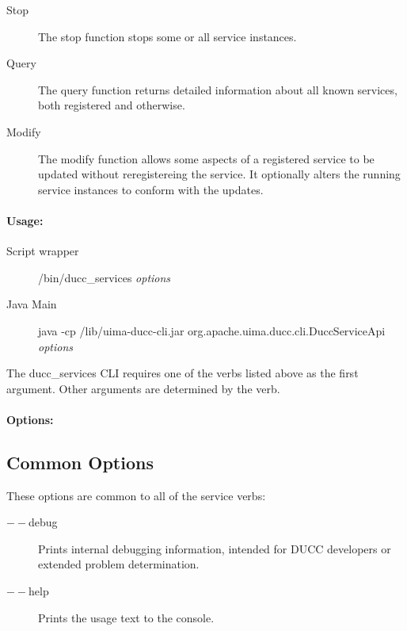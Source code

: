 \begin{description}
            \item[Stop] The stop function stops some or all service instances.
              
            \item[Query] The query function returns detailed information about all known services, both
              registered and otherwise.
              
            \item[Modify] The modify function allows some aspects of a registered service to be updated
              without reregistereing the service. It optionally alters the running service instances to
              conform with the updates.    
        \end{description}
            

    \paragraph{Usage:}
       \begin{description}
          \item[Script wrapper] \ducchome/bin/ducc\_services {\em options}
          \item[Java Main]      java -cp \ducchome/lib/uima-ducc-cli.jar org.apache.uima.ducc.cli.DuccServiceApi {\em options}
          \end{description}
          
          The ducc\_services CLI requires one of the verbs listed above as the first argument. Other arguments are determined
          by the verb.

    \paragraph{Options:}

    \subsection{Common Options}
        These options are common to all of the service verbs:
        \begin{description}
           \item[$--$debug ]          
             Prints internal debugging information, intended for DUCC developers or extended problem determination.                    
           \item[$--$help]
             Prints the usage text to the console. 
        \end{description}
        
